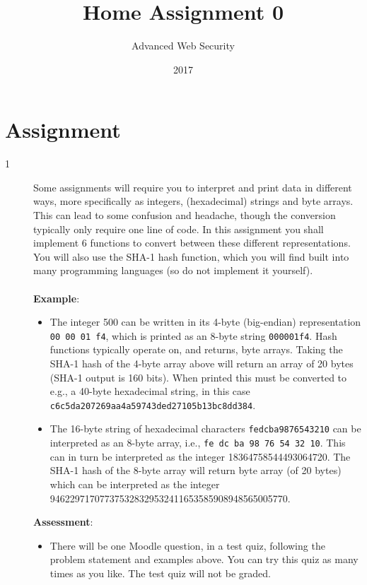 \documentclass{article}
\begin{document}
\title{Home Assignment 0}
\author{Advanced Web Security}
\date{2017}

\maketitle

\section*{Assignment}

\begin{description}

	\item[1~~~]{Some assignments will require you to interpret and print data in different ways, more specifically as integers, 
		(hexadecimal) strings and byte arrays. This can lead to some confusion and headache, though the conversion typically only require one line of code. 
		In this assignment you shall implement 6 functions to convert between these different representations. 
		You will also use the SHA-1 hash function, which you will find built into many programming languages (so do not implement it yourself).\\\\
    \textbf{Example}:
    
	\begin{itemize}
    
		\item The integer 500 can be written in its 4-byte (big-endian) representation \texttt{00 00 01 f4}, 
			which is printed as an 8-byte string \texttt{000001f4}. Hash functions typically operate on, and returns, byte arrays. 
			Taking the SHA-1 hash of the 4-byte array above will return an array of 20 bytes (SHA-1 output is 160 bits). 
			When printed this must be converted to e.g., a 40-byte hexadecimal string, in this case \texttt{c6c5da207269aa4a59743ded27105b13bc8dd384}.

    
		\item The 16-byte string of hexadecimal characters \texttt{fedcba9876543210} can be interpreted as an 8-byte array, 
			i.e., \texttt{fe dc ba 98 76 54 32 10}. This can in turn be interpreted as the integer 18364758544493064720. 
			The SHA-1 hash of the 8-byte array will return byte array (of 20 bytes) which can be interpreted as the integer 946229717077375328329532411653585908948565005770.
    \end{itemize}
	
	\textbf{Assessment}:
	\begin{itemize}
		
		\item There will be one Moodle question, in a test quiz, following the problem statement and examples above. You can try this quiz as many times as you like. The test quiz will not be graded.
	\end{itemize}
	}

\end{description}
\end{document}
